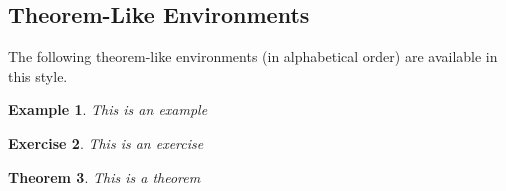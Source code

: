 \documentclass{book}\usepackage{knitr}
\newtheorem{theorem}{Theorem}
\newtheorem{acknowledgement}[theorem]{Acknowledgement}
\newtheorem{example}[theorem]{Example}
\newtheorem{exercise}[theorem]{Exercise}
\newtheorem{problem}[theorem]{Problem}
\newtheorem{remark}[theorem]{Remark}
\newtheorem{summary}[theorem]{Summary}
\newenvironment{proof}[1][Proof]{\textbf{#1.} }{\ \rule{0.5em}{0.5em}}
\begin{document}
\subsection{Theorem-Like Environments}

The following theorem-like environments (in alphabetical order) are available
in this style.


\begin{example}
This is an example
\end{example}

\begin{exercise}
This is an exercise
\end{exercise}








\begin{theorem}
This is a theorem
\end{theorem}



\end{document}
